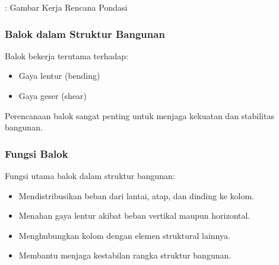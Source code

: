 \documentclass[../main.tex]{subfiles}
\begin{document}
\begin{frame}[mytitle=standard,c,mybg=bglight3,light]

	\begin{center}
		  : Gambar Kerja Rencana Pondasi
	\end{center}

\end{frame}

\begin{frame}[mytitle=center,t,mycolor=digiPH_uniblue,light]\frametitle{Balok dalam Struktur Bangunan}


	Balok bekerja terutama terhadap:

	\begin{itemize}
		\item Gaya lentur (bending)
		\item Gaya geser (shear)
	\end{itemize}

	\footnotesize Perencanaan balok sangat penting untuk menjaga kekuatan dan stabilitas bangunan. \normalsize
\end{frame}


\begin{frame}[mytitle=center,t,mycolor=digiPH_ocean,dark]\frametitle{Fungsi Balok}

	Fungsi utama balok dalam struktur bangunan:

	\begin{itemize}
		\item Mendistribusikan beban dari lantai, atap, dan dinding ke kolom.
		\item Menahan gaya lentur akibat beban vertikal maupun horizontal.
		\item Menghubungkan kolom dengan elemen struktural lainnya.
		\item Membantu menjaga kestabilan rangka struktur bangunan.
	\end{itemize}
\end{frame}
\end{document}
